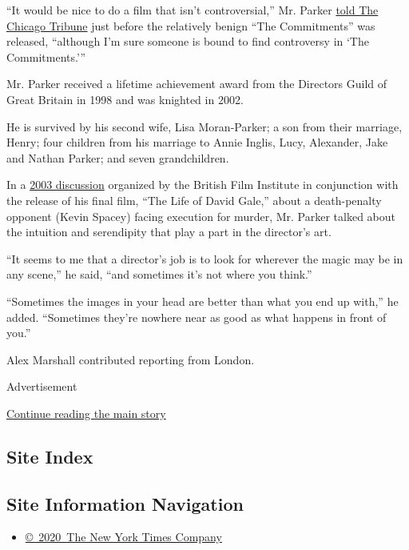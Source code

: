``It would be nice to do a film that isn't controversial,'' Mr. Parker
\href{https://www.chicagotribune.com/news/ct-xpm-1991-08-18-9103010538-story.html}{told
The Chicago Tribune} just before the relatively benign ``The
Commitments'' was released, ``although I'm sure someone is bound to find
controversy in `The Commitments.'''

Mr. Parker received a lifetime achievement award from the Directors
Guild of Great Britain in 1998 and was knighted in 2002.

He is survived by his second wife, Lisa Moran-Parker; a son from their
marriage, Henry; four children from his marriage to Annie Inglis, Lucy,
Alexander, Jake and Nathan Parker; and seven grandchildren.

In a
\href{https://www.bfi.org.uk/news-opinion/news-bfi/interviews/alan-parker-interview}{2003
discussion} organized by the British Film Institute in conjunction with
the release of his final film, ``The Life of David Gale,'' about a
death-penalty opponent (Kevin Spacey) facing execution for murder, Mr.
Parker talked about the intuition and serendipity that play a part in
the director's art.

``It seems to me that a director's job is to look for wherever the magic
may be in any scene,'' he said, ``and sometimes it's not where you
think.''

``Sometimes the images in your head are better than what you end up
with,'' he added. ``Sometimes they're nowhere near as good as what
happens in front of you.''

Alex Marshall contributed reporting from London.

Advertisement

\protect\hyperlink{after-bottom}{Continue reading the main story}

\hypertarget{site-index}{%
\subsection{Site Index}\label{site-index}}

\hypertarget{site-information-navigation}{%
\subsection{Site Information
Navigation}\label{site-information-navigation}}

\begin{itemize}
\tightlist
\item
  \href{https://help.nytimes.com/hc/en-us/articles/115014792127-Copyright-notice}{©~2020~The
  New York Times Company}
\end{itemize}

